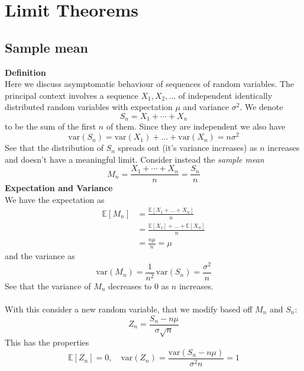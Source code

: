 \documentclass{report}
\begin{document}
\newpage

\section{Limit Theorems}
\subsection{Sample mean}
\textbf{Definition}\\
Here we discuss asymptomatic behaviour of sequences of random variables. The principal context involves a sequence 
$X_1,X_2,\ldots$ of independent identically distributed random variables with expectation $\mu$ and variance 
$\sigma^2$.
We denote
\begin{equation*}
S_n=X_1+\cdots+X_n
\end{equation*}
to be the sum of the first $n$ of them. Since they are independent we also have
\begin{equation*}
\text{var}(S_n)=\text{var}(X_1)+\ldots+\text{var}(X_n)=n\sigma^2
\end{equation*}
See that the distribution of $S_n$ spreads out (it's variance increases) as $n$ increases and doesn't have a 
meaningful limit. Consider instead the \textit{sample mean}
\begin{equation*}
M_n=\frac{X_1+\cdots+X_n}{n}=\frac{S_n}{n}
\end{equation*}
\textbf{Expectation and Variance}\\
We have the expectation as
\begin{align*}
\mathbb{E}[M_n]&=\frac{\mathbb{E}[X_1+\ldots+X_n]}{n}\\
&=\frac{\mathbb{E}[X_1]+\ldots+\mathbb{E}[X_n]}{n}\\
&=\frac{n\mu}{n}=\mu
\end{align*}
and the variance as
\begin{equation*}
\text{var}(M_n)=\frac{1}{n^2}\,\text{var}(S_n)=\frac{\sigma^2}{n}
\end{equation*}
See that the variance of $M_n$ decreases to 0 as $n$ increases.\\
\vspace{1mm}\\
With this consider a new random variable, that we modify based off $M_n$ and $S_n$:
\begin{equation*}
Z_n=\frac{S_n-n\mu}{\sigma\sqrt{n}}
\end{equation*}
This has the properties
\begin{equation*}
\mathbb{E}[Z_n]=0,\quad\text{var}(Z_n)=\frac{\text{var}(S_n-n\mu)}{\sigma^2n}=1
\end{equation*}
\newpage
\end{document}
